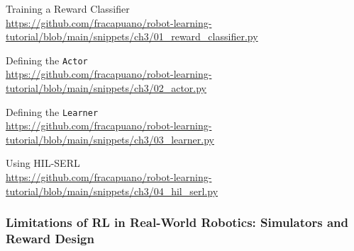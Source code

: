\begin{pbox}[label={ex:train_reward_classifier}]{Training a Reward Classifier \\ \url{https://github.com/fracapuano/robot-learning-tutorial/blob/main/snippets/ch3/01_reward_classifier.py}}
    
\end{pbox}

\begin{pbox}[label={ex:hil_serl_defining_actor}]{Defining the \texttt{Actor} \\ \url{https://github.com/fracapuano/robot-learning-tutorial/blob/main/snippets/ch3/02_actor.py}}
    
\end{pbox}


\begin{pbox}[label={ex:hil_serl_defining_learner}]{Defining the \texttt{Learner} \\ \url{https://github.com/fracapuano/robot-learning-tutorial/blob/main/snippets/ch3/03_learner.py}}
    
\end{pbox}

\begin{pbox}[label={ex:hil_serl_full}]{Using HIL-SERL \\ \url{https://github.com/fracapuano/robot-learning-tutorial/blob/main/snippets/ch3/04_hil_serl.py}}
    
\end{pbox}


\subsubsection{Limitations of RL in Real-World Robotics: Simulators and Reward Design}

